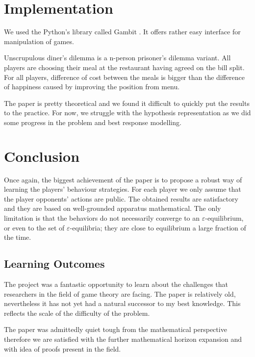 \documentclass[]{spie}  %
\begin{document}
\section{Implementation}
\label{sec:impl}
We used the Python's library called Gambit \cite{pygambit}. It offers rather easy interface for manipulation of games.

Unscrupulous diner's dilemma is a n-person prisoner's dilemma variant. All players are choosing their meal at the restaurant having agreed on the bill split. For all players, difference of cost between the meals is bigger than the difference of happiness caused by improving the position from menu.

The paper is pretty theoretical and we found it difficult to quickly put the results to the practice. For now, we struggle with the hypothesis representation as we did some progress in the problem and best response modelling.

\section{Conclusion}

Once again, the biggest achievement of the paper is to propose a robust way of learning the players' behaviour strategies. For each player we only assume that the player opponents' actions are public. The obtained results are satisfactory and they are based on well-grounded apparatus mathematical. The only limitation is that the behaviors do not necessarily converge to an $\varepsilon$-equilibrium, or even to the
set of $\varepsilon$-equilibria; they are close to equilibrium a large fraction of the time.


\subsection{Learning Outcomes}
\label{sec:conclusion1}

The project was a fantastic opportunity to learn about the challenges that researchers in the field of game theory are facing. The paper is relatively old, nevertheless it has not yet had a natural successor to my best knowledge. This reflects the scale of the difficulty of the problem.

The paper was admittedly quiet tough from the mathematical perspective therefore we are satisfied with the further mathematical horizon expansion and with idea of proofs present in the field.
\end{document}
